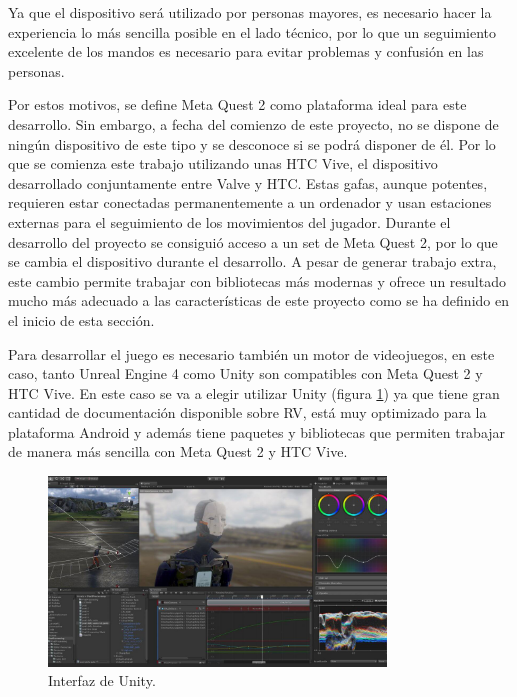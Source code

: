 Ya que el dispositivo será utilizado por personas mayores, es necesario hacer la experiencia lo más sencilla posible en el lado técnico, por lo que un seguimiento excelente de los mandos es necesario para evitar problemas y confusión en las personas.

Por estos motivos, se define Meta Quest 2 como plataforma ideal para este desarrollo. Sin embargo, a fecha del comienzo de este proyecto, no se dispone de ningún dispositivo de este tipo y se desconoce si se podrá disponer de él. Por lo que se comienza este trabajo utilizando unas HTC Vive, el dispositivo desarrollado conjuntamente entre Valve y HTC. Estas gafas, aunque potentes, requieren estar conectadas permanentemente a un ordenador y usan estaciones externas para el seguimiento de los movimientos del jugador. Durante el desarrollo del proyecto se consiguió acceso a un set de Meta Quest 2, por lo que se cambia el dispositivo durante el desarrollo. A pesar de generar trabajo extra, este cambio permite trabajar con bibliotecas más modernas y ofrece un resultado mucho más adecuado a las características de este proyecto como se ha definido en el inicio de esta sección.


Para desarrollar el juego es necesario también un motor de videojuegos, en este caso, tanto Unreal Engine 4 como Unity son compatibles con Meta Quest 2 y HTC Vive. En este caso se va a elegir utilizar Unity (figura \ref{fig:TU_interfazUnity}) ya que tiene gran cantidad de documentación disponible sobre RV, está muy optimizado para la plataforma Android y además tiene paquetes y bibliotecas que permiten trabajar de manera más sencilla con Meta Quest 2 y HTC Vive.

\begin{figure}
  \centering
\includegraphics[width=0.8\textwidth]{03.EstudioProblema/03.TecnologiaAUsar/00.Figuras/02.interfaz_unity.jpg}
    \caption{Interfaz de Unity. \cite{EA_img_interfazUnity}}
    \label{fig:TU_interfazUnity}
\end{figure}

